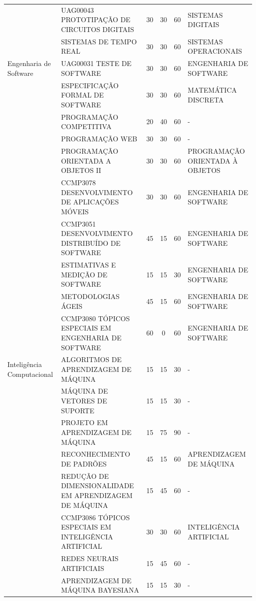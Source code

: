 \documentclass[
	12pt,				%
	openright,			%
  oneside,     %
	a4paper,			%
	chapter=TITLE,		%
	english,			%
	french,				%
	spanish,			%
	brazil				%
	]{abntex2}
\begin{document}
\begin{center}
\begin{tiny}
\begin{longtable}{p{2.5cm}p{5.5cm}cccp{3.3cm}}
      & UAG00043 PROTOTIPAÇÃO DE CIRCUITOS DIGITAIS & 30 & 30 & 60 & SISTEMAS DIGITAIS \\ \cline{2-6}
      & SISTEMAS DE TEMPO REAL & 30 & 30 & 60 & SISTEMAS OPERACIONAIS \\ \midrule
      Engenharia de Software & UAG00031 TESTE DE SOFTWARE & 30 & 30 & 60 & ENGENHARIA DE SOFTWARE \\ \cline{2-6}
      & ESPECIFICAÇÃO FORMAL DE SOFTWARE & 30 & 30 & 60 & MATEMÁTICA DISCRETA \\ \cline{2-6}
      & PROGRAMAÇÃO COMPETITIVA & 20 & 40 & 60 & - \\ \cline{2-6}
      & PROGRAMAÇÃO WEB & 30 & 30 & 60 & - \\ \cline{2-6}
      & PROGRAMAÇÃO ORIENTADA A OBJETOS II & 30 & 30 & 60 & PROGRAMAÇÃO ORIENTADA À OBJETOS \\ \cline{2-6}
      & CCMP3078 DESENVOLVIMENTO DE APLICAÇÕES MÓVEIS & 30 & 30 & 60 & ENGENHARIA DE SOFTWARE \\ \cline{2-6}
      & CCMP3051 DESENVOLVIMENTO DISTRIBUÍDO DE SOFTWARE & 45 & 15 & 60 & ENGENHARIA DE SOFTWARE \\ \cline{2-6}
      & ESTIMATIVAS E MEDIÇÃO DE SOFTWARE & 15 & 15 & 30 & ENGENHARIA DE SOFTWARE \\ \cline{2-6}
      & METODOLOGIAS ÁGEIS & 45 & 15 & 60 & ENGENHARIA DE SOFTWARE \\ \cline{2-6}
      & CCMP3080 TÓPICOS ESPECIAIS EM ENGENHARIA DE SOFTWARE & 60 & 0 & 60 & ENGENHARIA DE SOFTWARE \\ \midrule
    Inteligência Computacional & ALGORITMOS DE APRENDIZAGEM DE MÁQUINA & 15 & 15 & 30 & - \\ \cline{2-6}
      & MÁQUINA DE VETORES DE SUPORTE & 15 & 15 & 30 & - \\ \cline{2-6}
      & PROJETO EM APRENDIZAGEM DE MÁQUINA & 15 & 75 & 90 & - \\ \cline{2-6}
      & RECONHECIMENTO DE PADRÕES & 45 & 15 & 60 & APRENDIZAGEM DE MÁQUINA \\ \cline{2-6}
      & REDUÇÃO DE DIMENSIONALIDADE EM APRENDIZAGEM DE MÁQUINA & 15 & 45 & 60 & - \\ \cline{2-6}
      & CCMP3086 TÓPICOS ESPECIAIS EM INTELIGÊNCIA ARTIFICIAL & 30 & 30 & 60 & INTELIGÊNCIA ARTIFICIAL \\ \cline{2-6}
      & REDES NEURAIS ARTIFICIAIS & 15 & 45 & 60 & - \\ \cline{2-6}
      & APRENDIZAGEM DE MÁQUINA BAYESIANA & 15 & 15 & 30 & - \\ \cline{2-6}

\end{longtable}
\end{tiny}
\end{center}
\end{document}
